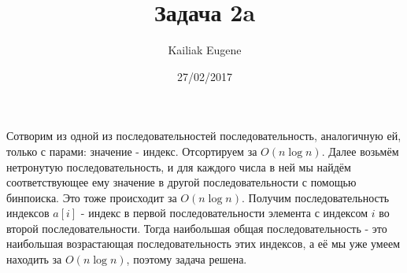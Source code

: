 \documentclass[12pt,a4paper]{article}
\title{Задача 2a}
\date{27/02/2017}
\author{Kailiak Eugene}
\begin{document}
\maketitle
Сотворим из одной из последовательностей последовательность, аналогичную ей, только с парами: значение - индекс. Отсортируем за $O(n \log n)$. Далее возьмём нетронутую последовательность, и для каждого числа в ней мы найдём соответствующее ему значение в другой последовательности с помощью бинпоиска. Это тоже происходит за $O(n \log n)$. Получим последовательность индексов $a[i]$ - индекс в первой последовательности элемента с индексом $i$ во второй последовательности. Тогда наибольшая общая последовательность - это наибольшая возрастающая последовательность этих индексов, а её мы уже умеем находить за $O(n \log n)$, поэтому задача решена.
\end{document}

